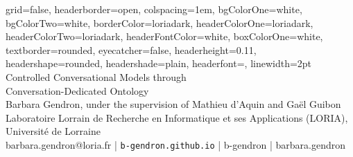 \documentclass[a0paper,portrait]{baposter}
\begin{document}

\begin{poster}
{
grid=false,
headerborder=open, %
colspacing=1em, %
bgColorOne=white, %
bgColorTwo=white, %
borderColor=loriadark, %
headerColorOne=loriadark, %
headerColorTwo=loriadark, %
headerFontColor=white, %
boxColorOne=white, %
textborder=rounded, %
eyecatcher=false, %
headerheight=0.11\textheight, %
headershape=rounded, %
headershade=plain,
headerfont=\Large\textsf, %
linewidth=2pt %
}
{}
%
%
{\textsf{Controlled Conversational Models through \\ Conversation-Dedicated Ontology}}
{\sf\vspace{0.3em}\\
Barbara Gendron, under the supervision of Mathieu d'Aquin and Gaël Guibon
\vspace{0.1em}\\
\small{Laboratoire Lorrain de Recherche en Informatique et ses Applications (LORIA), Université de Lorraine
\vspace{0.2em}\\
\faEnvelopeO \enspace barbara.gendron@loria.fr | \faDesktop \enspace \texttt{b-gendron.github.io} | \faGithub \enspace b-gendron | \faLinkedin \enspace barbara.gendron
}}
{
}%


\end{poster}
\end{document}
